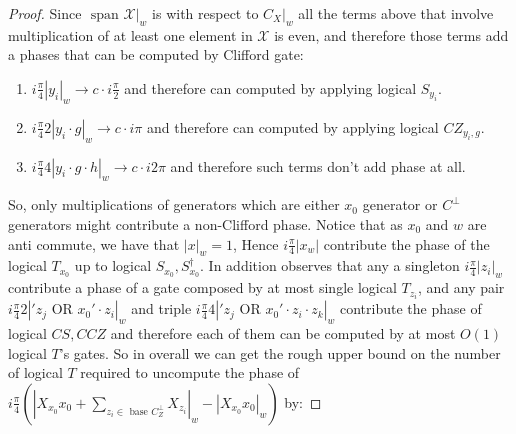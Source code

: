 \documentclass[manuscript,screen,review]{acmart}
\begin{document}
\begin{proof}
  Since $\text{ span } \mathcal{X}|_{w}$ is \trig with respect to $C_{X}|_{w}$ all the terms above that involve multiplication of at least one element in $\mathcal{X}$ is even, and therefore those terms add a phases that can be computed by Clifford gate:\begin{enumerate}
    \item $i\frac{\pi}{4}|y_{i}|_{w} \rightarrow c \cdot i\frac{\pi}{2}$ and therefore can computed by applying logical $S_{y_{i}}$.
    \item $i\frac{\pi}{4}2|y_{i}\cdot g|_{w} \rightarrow c \cdot i\pi$ and therefore can computed by applying logical $CZ_{y_{i},g}$.
    \item $i\frac{\pi}{4}4|y_{i}\cdot g \cdot h |_{w} \rightarrow c \cdot i2\pi$ and therefore such terms don't add phase at all.
  \end{enumerate}
So, only multiplications of generators which are either $x_{0}$ generator or $C^{\perp}$ generators might contribute a non-Clifford phase. Notice that as $x_{0}$ and $w$ are anti commute, we have that $|x|_{w}=1$, Hence $i\frac{\pi}{4}|x_{w}|$ contribute the phase of the logical $T_{x_{0}}$ up to logical $S_{x_{0}},S^{\dagger}_{x_{0}}$. In addition observes that any a singleton $i\frac{\pi}{4}|z_{i}|_{w}$ contribute a phase of a gate composed by at most single logical $T_{z_{i}}$, and any pair $i\frac{\pi}{4}2|' z_{j} \text{ OR } x_{0}'\cdot z_{i}|_{w}$ and triple $i\frac{\pi}{4}4|' z_{j} \text{ OR } x_{0}'\cdot z_{i} \cdot z_{k}|_{w}$ contribute the phase of logical $CS, CCZ$ and therefore each of them can be computed by at most $O(1)$ logical $T$'s gates. So in overall we can get the rough upper bound on the number of logical $T$ required to uncompute the phase of $i\frac{\pi}{4} \left(|X_{x_{0}}x_{0} + \sum_{z_i \in \text{ base } C_{Z}^{\perp}}{X_{z_{i}}}|_{w} - |X_{x_{0}}x_{0}|_{w} \right)$ by:
  
\end{proof}





%

\printbibliography
\end{document}
